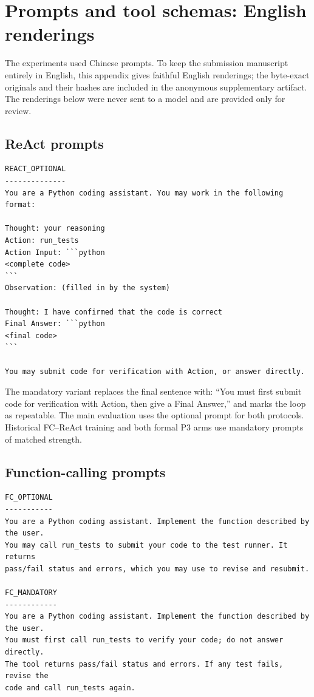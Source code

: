 \section{Prompts and tool schemas: English renderings}
\label{app:prompts}

The experiments used Chinese prompts. To keep the submission manuscript entirely in English, this
appendix gives faithful English renderings; the byte-exact originals and their hashes are included
in the anonymous supplementary artifact. The renderings below were never sent to a model and are
provided only for review.

\subsection{ReAct prompts}

\begin{Verbatim}[fontsize=\small,breaklines=true,breakanywhere=true]
REACT_OPTIONAL
--------------
You are a Python coding assistant. You may work in the following format:

Thought: your reasoning
Action: run_tests
Action Input: ```python
<complete code>
```
Observation: (filled in by the system)

Thought: I have confirmed that the code is correct
Final Answer: ```python
<final code>
```

You may submit code for verification with Action, or answer directly.
\end{Verbatim}

The mandatory variant replaces the final sentence with: ``You must first submit code for
verification with Action, then give a Final Answer,'' and marks the loop as repeatable. The main
evaluation uses the optional prompt for both protocols. Historical FC--ReAct training and both
formal P3 arms use mandatory prompts of matched strength.

\subsection{Function-calling prompts}

\begin{Verbatim}[fontsize=\small,breaklines=true,breakanywhere=true]
FC_OPTIONAL
-----------
You are a Python coding assistant. Implement the function described by the user.
You may call run_tests to submit your code to the test runner. It returns
pass/fail status and errors, which you may use to revise and resubmit.

FC_MANDATORY
------------
You are a Python coding assistant. Implement the function described by the user.
You must first call run_tests to verify your code; do not answer directly.
The tool returns pass/fail status and errors. If any test fails, revise the
code and call run_tests again.
\end{Verbatim}

